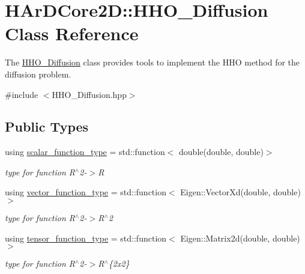 \hypertarget{classHArDCore2D_1_1HHO__Diffusion}{}\section{H\+Ar\+D\+Core2D\+:\+:H\+H\+O\+\_\+\+Diffusion Class Reference}
\label{classHArDCore2D_1_1HHO__Diffusion}


The \hyperlink{classHArDCore2D_1_1HHO__Diffusion}{H\+H\+O\+\_\+\+Diffusion} class provides tools to implement the H\+HO method for the diffusion problem.  




{\ttfamily \#include $<$H\+H\+O\+\_\+\+Diffusion.\+hpp$>$}

\subsection*{Public Types}
\begin{DoxyCompactItemize}
\item 
\mbox{\label{classHArDCore2D_1_1HHO__Diffusion_abe94c05310207687b5f3a4af2ea1c97b}} 
using \hyperlink{classHArDCore2D_1_1HHO__Diffusion_abe94c05310207687b5f3a4af2ea1c97b}{scalar\+\_\+function\+\_\+type} = std\+::function$<$ double(double, double)$>$
\begin{DoxyCompactList}\small\item\em type for function R$^\wedge$2-\/$>$R \end{DoxyCompactList}\item 
\mbox{\label{classHArDCore2D_1_1HHO__Diffusion_adad1657301e86deba6abcb5e7e6048e4}} 
using \hyperlink{classHArDCore2D_1_1HHO__Diffusion_adad1657301e86deba6abcb5e7e6048e4}{vector\+\_\+function\+\_\+type} = std\+::function$<$ Eigen\+::\+Vector\+Xd(double, double)$>$
\begin{DoxyCompactList}\small\item\em type for function R$^\wedge$2-\/$>$R$^\wedge$2 \end{DoxyCompactList}\item 
\mbox{\label{classHArDCore2D_1_1HHO__Diffusion_af2d9bd4031a898a3619812343aa5c2c9}} 
using \hyperlink{classHArDCore2D_1_1HHO__Diffusion_af2d9bd4031a898a3619812343aa5c2c9}{tensor\+\_\+function\+\_\+type} = std\+::function$<$ Eigen\+::\+Matrix2d(double, double)$>$
\begin{DoxyCompactList}\small\item\em type for function R$^\wedge$2-\/$>$R$^\wedge$\{2x2\} \end{DoxyCompactList}\end{DoxyCompactItemize}
